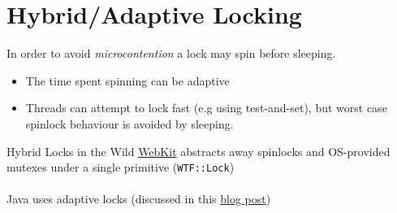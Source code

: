 \section{Hybrid/Adaptive Locking}
In order to avoid \textit{microcontention} a lock may spin before sleeping.
\begin{itemize}
  \item The time spent spinning can be adaptive
  \item Threads can attempt to lock fast (e.g using test-and-set), but worst case spinlock behaviour is avoided by sleeping.
\end{itemize}
\begin{sidenotebox}{Hybrid Locks in the Wild}
  \href{https://webkit.org/blog/6161/locking-in-webkit/}{WebKit} abstracts away spinlocks and OS-provided mutexes under a single primitive (\texttt{WTF::Lock})
  \\
  \\ Java uses adaptive locks (discussed in this \href{https://blog.openj9.org/2019/04/02/adaptive-spinning/}{blog post})
\end{sidenotebox}
